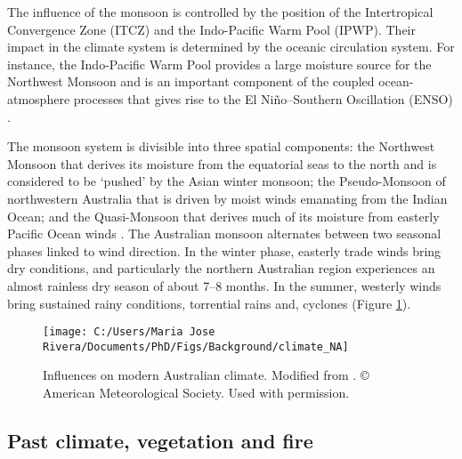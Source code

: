 \documentclass[
  12pt,
]{book}
\begin{document}
The influence of the monsoon is controlled by the position of the Intertropical Convergence Zone (ITCZ) and the Indo-Pacific Warm Pool (IPWP). Their impact in the climate system is determined by the oceanic circulation system. For instance, the Indo-Pacific Warm Pool provides a large moisture source for the Northwest Monsoon and is an important component of the coupled ocean-atmosphere processes that gives rise to the El Niño--Southern Oscillation (ENSO) \citep{kershawAustraliaSouthwestPacific2012}.

The monsoon system is divisible into three spatial components: the Northwest Monsoon that derives its moisture from the equatorial seas to the north and is considered to be `pushed' by the Asian winter monsoon; the Pseudo-Monsoon of northwestern Australia that is driven by moist winds emanating from the Indian Ocean; and the Quasi-Monsoon that derives much of its moisture from easterly Pacific Ocean winds \citep{gentilliClimatesAustraliaNew1971}. The Australian monsoon alternates between two seasonal phases linked to wind direction. In the winter phase, easterly trade winds bring dry conditions, and particularly the northern Australian region experiences an almost rainless dry season of about 7--8 months. In the summer, westerly winds bring sustained rainy conditions, torrential rains and, cyclones (Figure \ref{fig:fig-modern}).

\begin{figure}

{\centering \texttt{[image: C:/Users/Maria Jose Rivera/Documents/PhD/Figs/Background/climate\_NA]} 

}

\caption{Influences on modern Australian climate. Modified from \citet{risbeyRemoteDriversRainfall2009}. © American Meteorological Society. Used with permission.}\label{fig:fig-modern}
\end{figure}



\hypertarget{pastclimate}{%
\subsection{Past climate, vegetation and fire}\label{pastclimate}}
\end{document}
